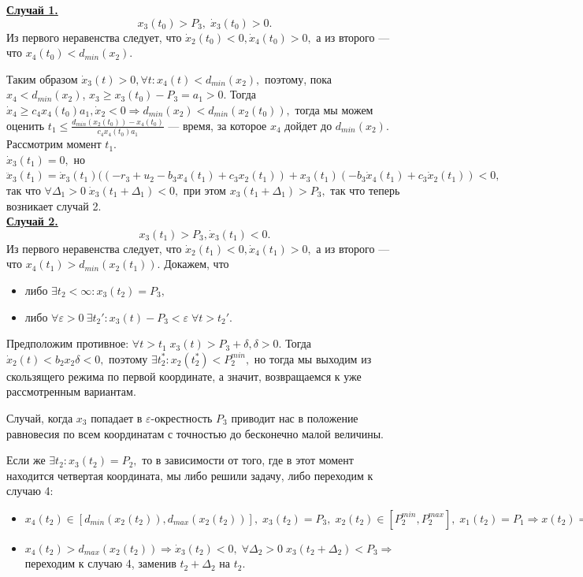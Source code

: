 \documentclass[11pt]{article}
\begin{document}
\underline {\bf Случай 1.} 
$$x_3(t_0) > P_3, \; \dot x_3(t_0) > 0.$$
Из первого неравенства следует, что $\dot x_2(t_0) < 0, \dot x_4(t_0) > 0,$ а из второго --- что $x_4(t_0) < d_{min}(x_2).$

Таким образом $\dot x_3(t) > 0, \forall t : x_4(t) < d_{min}(x_2),$ поэтому, пока $x_4 < d_{min}(x_2)$, $ x_3 \geqslant x_3(t_0) - P_3 = a_1 > 0.$ Тогда $\dot x_4 \geqslant c_4x_4(t_0)a_1, \dot x_2 < 0 \Rightarrow d_{min}(x_2) < d_{min}(x_2(t_0)),$ тогда мы можем оценить $t_1 \leqslant \frac{d_{min}(x_2(t_0)) - x_4(t_0)}{c_4x_4(t_0)a_1}$ --- время, за которое $x_4$ дойдет до $d_{min}(x_2)$.\\
Рассмотрим момент $t_1.$ \\
$\dot x_3(t_1) = 0,$ но $\ddot x_3(t_1) = \dot x_3(t_1)((-r_3 + u_2 - b_3x_4(t_1) + c_3x_2(t_1)) + x_3(t_1)(-b_3\dot x_4(t_1) + c_3 \dot x_2(t_1)) < 0,$ так что $\forall \Delta_1 > 0 \; \dot x_3(t_1 + \Delta_1) < 0,$ при этом $x_3(t_1 + \Delta_1) > P_3,$ так что теперь возникает случай 2.\\

\underline{\bf Случай 2.}
$$x_3(t_1) > P_3, \dot x_3(t_1) < 0.$$
Из первого неравенства следует, что $\dot x_2(t_1) < 0, \dot x_4(t_1) > 0,$ а из второго --- что $x_4(t_1) > d_{min}(x_2(t_1)).$ Докажем, что 
\begin{itemize}
	\item либо $\exists t_2 < \infty:  x_3(t_2) = P_3,$
	\item либо $\forall \varepsilon > 0 \: \exists t_2' : x_3(t) - P_3 < \varepsilon \; \forall t > t_2'.$
\end{itemize}
Предположим противное: $\forall t > t_1 \; x_3(t) > P_3 + \delta, \delta > 0.$ Тогда $\dot x_2(t) < b_2x_2\delta < 0,$ поэтому $\exists t_2^* : x_2(t_2^*) < P_2^{min},$ но тогда мы выходим из скользящего режима по первой координате, а значит, возвращаемся к уже рассмотренным вариантам.

Случай, когда $x_3$ попадает в $\varepsilon$-окрестность $P_3$ приводит нас в положение равновесия по всем координатам с точностью до бесконечно малой величины.

Если же $\exists t_2 : x_3(t_2) = P_2,$ то в зависимости от того, где в этот момент находится четвертая координата, мы либо решили задачу, либо переходим к случаю 4:
\begin{itemize}
	\item $x_4(t_2) \in [d_{min}(x_2(t_2)), d_{max}(x_2(t_2))], \; x_3(t_2) = P_3, \; x_2(t_2) \in [P_2^{min}, P_2^{max}], \; x_1(t_2) = P_1 \Rightarrow x(t_2) = P(u).$
	\item $x_4(t_2) > d_{max}(x_2(t_2)) \Rightarrow \dot x_3(t_2) < 0, \; \forall \Delta_2 > 0 \; x_3(t_2 + \Delta_2) < P_3 \Rightarrow$ переходим к случаю 4, заменив $t_2 + \Delta_2$ на $t_2$.
\end{itemize}
\end{document}

